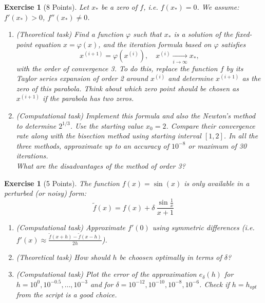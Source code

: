 \documentclass[11pt,a4paper,english,hyperref]{article}
\newcounter{aufgabeNummer}
\theoremstyle{break}   %
\newtheorem{Aufgabe}[aufgabeNummer]{Exercise}
\begin{document}
\begin{Aufgabe}[8 Points]
  Let $x_*$ be a zero of $f$, i.e. $f(x_*)=0$. We assume:  $f'(x_*)> 0$, $f''(x_*)\neq 0$.
  \begin{enumerate}
    \item (Theoretical task) Find a function $\varphi$ such that $x_*$ is a solution of the fixed-point equation $x=\varphi(x)$, and the iteration formula based on $\varphi$ satisfies
    \begin{equation*}
      x^{(i+1)}=\varphi(x^{(i)}), \quad x^{(i)} \xrightarrow[i\to \infty]{} x_*, 
    \end{equation*}
    with the order of convergence 3. To do this, replace the function $f$ by its Taylor series expansion of order 2 around $x^{(i)}$ and determine $x^{(i+1)}$ as the zero of this parabola. Think about which zero point should be chosen as $x^{(i + 1)}$ if the parabola has two zeros. 
    \item (Computational task) Implement this formula and also the Newton's method to determine $2^{1/3}$. Use the starting value $x_0 = 2$. Compare their convergence rate along with the bisection method using starting interval $[1, 2]$. In all the three methods, approximate up to an accuracy of $10^{-8}$ or maximum of 30 iterations.\\ What are the disadvantages of the method of order 3?
  \end{enumerate}
\end{Aufgabe}

\begin{Aufgabe}[5 Points]
  The function $f(x)=\sin(x)$ is only available in a perturbed (or noisy) form:  
  \begin{equation*}
    \tilde f(x) = f(x)+\delta ~ \dfrac{\sin \frac{1}{x}}{x+1}
  \end{equation*}
  \begin{enumerate}
    \item (Computational task) Approximate $f'(0)$ using symmetric differences (i.e. $ f'(x) \approx \frac{\tilde f(x+h)-\tilde f(x-h)}{2h}$).
    \item (Theoretical task) How should $h$ be choosen optimally in terms of $\delta$?
    \item (Computational task) Plot the error of the approximation $e_\delta(h)$ for $h=10^0,10^{-0.5},\ldots , 10^{-3}$ and for $\delta=10^{-12},10^{-10},10^{-8},10^{-6}$. Check if $h=h_{opt}$ from the script is a good choice.
  \end{enumerate}

\end{Aufgabe}




\end{document}
